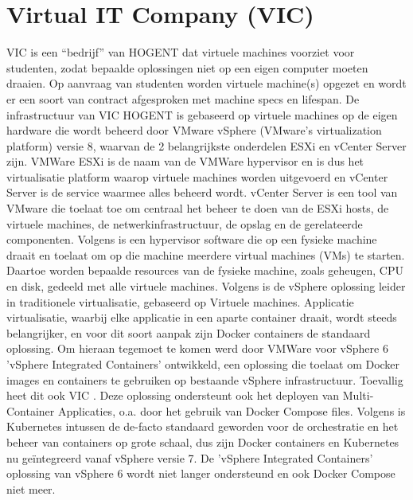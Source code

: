 \section{Virtual IT Company (VIC)}
VIC is een ``bedrijf'' van HOGENT dat virtuele machines voorziet voor studenten, zodat bepaalde oplossingen niet op een eigen computer moeten draaien. Op aanvraag van studenten worden virtuele machine(s) opgezet en wordt er een soort van contract afgesproken met machine specs en lifespan.
\newline
\newline
De infrastructuur van VIC HOGENT is gebaseerd op virtuele machines op de eigen hardware die wordt beheerd door VMware vSphere (VMware's virtualization platform) versie 8, waarvan de 2 belangrijkste onderdelen ESXi en vCenter Server zijn.
\newline
VMWare ESXi is de naam van de VMWare hypervisor en is dus het virtualisatie platform waarop virtuele machines worden uitgevoerd en vCenter Server is de service waarmee alles beheerd wordt.
\newline
vCenter Server is een tool van VMware die toelaat toe om centraal het beheer te doen van de ESXi hosts, de virtuele machines, de netwerkinfrastructuur, de opslag en de gerelateerde componenten.
\newline
Volgens \textcite{VMware2023a} is een hypervisor software die op een fysieke machine draait en toelaat om op die machine meerdere virtual machines (VMs) te starten. Daartoe worden bepaalde resources van de fysieke machine, zoals geheugen, CPU en disk, gedeeld met alle virtuele machines.
\newline
Volgens \textcite{VMware2023b} is de vSphere oplossing leider in traditionele virtualisatie, gebaseerd op Virtuele machines.
\newline
Applicatie virtualisatie, waarbij elke applicatie in een aparte container draait, wordt steeds belangrijker, en voor dit soort aanpak zijn Docker containers de standaard oplossing. Om hieraan tegemoet te komen werd door VMWare voor vSphere 6 'vSphere Integrated Containers' ontwikkeld, een oplossing die toelaat om Docker images en containers te gebruiken op bestaande vSphere infrastructuur. Toevallig heet dit ook VIC \autocite{VMware2023b}.
Deze oplossing ondersteunt ook het deployen van Multi-Container Applicaties, o.a. door het gebruik van Docker Compose files.
\newline
\newline
Volgens \textcite{VMware2021} is Kubernetes intussen de de-facto standaard geworden voor de orchestratie en het beheer van containers op grote schaal, dus zijn Docker containers en Kubernetes nu geïntegreerd vanaf vSphere versie 7. De 'vSphere Integrated Containers' oplossing van vSphere 6 wordt niet langer ondersteund en ook Docker Compose niet meer.
